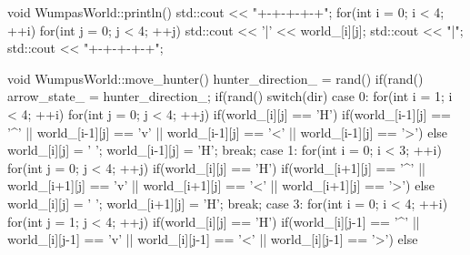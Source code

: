 \begin{answercode}
{{{        }
    }
}
void WumpasWorld::println()
{
    std::cout << "+-+-+-+-+\n";
    for(int i = 0; i < 4; ++i)
    {
        for(int j = 0; j < 4; ++j)
        {
            std::cout << '|' << world_[i][j];
        }
        std::cout << "|\n";
        std::cout << "+-+-+-+-+\n";
    }
}


void WumpusWorld::move_hunter()
{
    hunter_direction_ = rand() %
    if(rand() %
    {
        arrow_state_ = hunter_direction_;
    }
    if(rand() %
    {
        switch(dir)
        {
            case 0:
                for(int i = 1; i < 4; ++i)
                {
                    for(int j = 0; j < 4; ++j)
                    {
                        if(world_[i][j] == 'H')
                        {
                            if(world_[i-1][j] == '^' ||
                               world_[i-1][j] == 'v' ||
                               world_[i-1][j] == '<' ||
                               world_[i-1][j] == '>')
                            {}
                            else
                            {
                                world_[i][j] = ' ';
                                world_[i-1][j] = 'H';
                            }
                        }
                    }
                }
                break;
            case 1:
                for(int i = 0; i < 3; ++i)
                {
                    for(int j = 0; j < 4; ++j)
                    {
                        if(world_[i][j] == 'H')
                        {
                            if(world_[i+1][j] == '^' ||
                               world_[i+1][j] == 'v' ||
                               world_[i+1][j] == '<' ||
                               world_[i+1][j] == '>')
                            {}
                            else
                            {
                                world_[i][j] = ' ';
                                world_[i+1][j] = 'H';
                            }
                        }
                    }
                }
                break;
            case 3:
                for(int i = 0; i < 4; ++i)
                {
                    for(int j = 1; j < 4; ++j)
                    {
                        if(world_[i][j] == 'H')
                        {
                            if(world_[i][j-1] == '^' ||
                               world_[i][j-1] == 'v' ||
                               world_[i][j-1] == '<' ||
                               world_[i][j-1] == '>')
                            {}
                            else
}}}}}}
\end{answercode}
